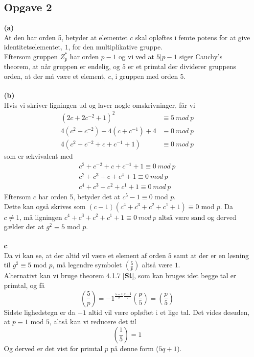 \documentclass[12pt]{article}
\begin{document}
\subsection*{Opgave 2}
\textbf{(a)}\\
At den har orden 5, betyder at elementet $c$ skal opløftes i femte potens for at give identitetselementet, $1$, for den multiplikative gruppe.\\
Eftersom gruppen $Z_p^*$ har orden $p-1$ og vi ved at $5|p-1$ siger Cauchy's theorem, at når gruppen er endelig, og $5$ er et primtal der dividerer gruppens orden, at der må være et element, $c$, i gruppen med orden $5$.\\
\\
\textbf{(b)}\\
Hvis vi skriver ligningen ud og laver nogle omskrivninger, får vi
\begin{align*}
(2c+2c^{-2}+1)^2&\equiv 5\:mod\:p \\
4(c^2+c^{-2})+4(c+c^{-1})+4&\equiv 0\:mod\:p \\
4(c^2+c^{-2}+c+c^{-1}+1)&\equiv 0\:mod\:p
\end{align*}
som er ækvivalent med 
\begin{align}
c^2+c^{-2}+c+c^{-1}+1\equiv 0 \:mod\:p \\
c^2+c^{3}+c+c^{4}+1\equiv 0 \:mod\:p \\
c^4+c^{3}+c^2+c^{1}+1\equiv 0 \:mod\:p
\end{align}
Eftersom $c$ har orden 5, betyder det at $c^5-1\equiv 0$ mod $p$. \\
Dette kan også skrives som $(c-1)(c^4+c^{3}+c^2+c^{1}+1)\equiv 0$ mod $p$. Da $c\neq 1$, må ligningen $c^4+c^{3}+c^2+c^{1}+1\equiv 0 \:mod\:p$ altså være sand og derved gælder det at $g^2\equiv 5$ mod $p$.\\
\\
\textbf{c}\\
Da vi kan se, at der altid vil være et element af orden $5$ samt at der er en løsning til $g^2\equiv 5$ mod $p$, må legendre symbolet $(\frac{5}{p})$ altså være $1$.\\
Alternativt kan vi bruge theorem 4.1.7 [\textbf{St}], som kan bruges idet begge tal er primtal, og få
$$(\frac{5}{p})=-1^{\frac{5-1}{2}\frac{p-1}{2}}(\frac{p}{5})=(\frac{p}{5})$$
Sidste lighedstegn er da $-1$ altid vil være opløftet i et lige tal. Det vides desuden, at $p\equiv 1$ mod $5$, altså kan vi reducere det til
$$(\frac{1}{5})=1$$
Og derved er det vist for primtal $p$ på denne form ($5q+1$).
\end{document}
